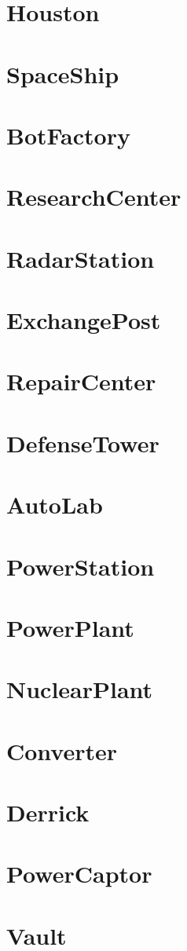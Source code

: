 \section{Houston}
\section{SpaceShip}
\section{BotFactory}
\section{ResearchCenter}
\section{RadarStation}
\section{ExchangePost}
\section{RepairCenter}
\section{DefenseTower}
\section{AutoLab}
\section{PowerStation}
\section{PowerPlant}
\section{NuclearPlant}
\section{Converter}
\section{Derrick}
\section{PowerCaptor}
\section{Vault}